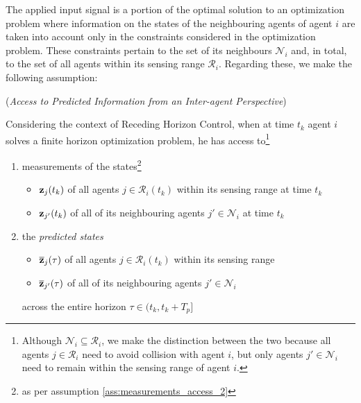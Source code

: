 The applied input signal is a portion of the optimal solution to an
optimization problem where information on the states of the neighbouring agents
of agent $i$ are taken into account only in the constraints considered in the
optimization problem. These constraints pertain to the set of its neighbours
$\mathcal{N}_i$ and, in total, to the set of all agents within its sensing
range $\mathcal{R}_i$. Regarding these, we make the following assumption:

\begin{gg_box}
  \begin{assumption} (\textit{Access to Predicted Information from an
    Inter-agent Perspective})

Considering the context of Receding Horizon Control, when
at time $t_k$ agent $i$ solves a finite horizon optimization problem, he has
access to\footnote{Although
  $\mathcal{N}_i \subseteq \mathcal{R}_i$, we make the distinction between
  the two because all agents $j \in \mathcal{R}_i$ need to avoid collision
  with agent $i$, but only agents $j' \in \mathcal{N}_i$ need to remain
  within the sensing range of agent $i$.
}

\begin{enumerate}
  \item measurements of the states\footnote{as per assumption
    \eqref{ass:measurements_access_2}}
    \begin{itemize}
      \item $\bm{\mathbf{z}}_j(t_k)$ of all agents $j \in \mathcal{R}_i(t_k)$ within its sensing range at time $t_k$
      \item $\bm{\mathbf{z}}_{j'}(t_k)$ of all of its neighbouring agents $j' \in \mathcal{N}_i$ at time $t_k$
      \end{itemize}
    \item the \textit{predicted states}
      \begin{itemize}
        \item $\overline{\bm{\mathbf{z}}}_j(\tau)$ of all agents $j \in \mathcal{R}_i(t_k)$ within its sensing range
        \item $\overline{\bm{\mathbf{z}}}_{j'}(\tau)$ of all of its neighbouring agents $j' \in \mathcal{N}_i$
      \end{itemize}
      across the entire horizon $\tau \in (t_k, t_k + T_p]$
\end{enumerate}
\end{assumption}
\end{gg_box}
